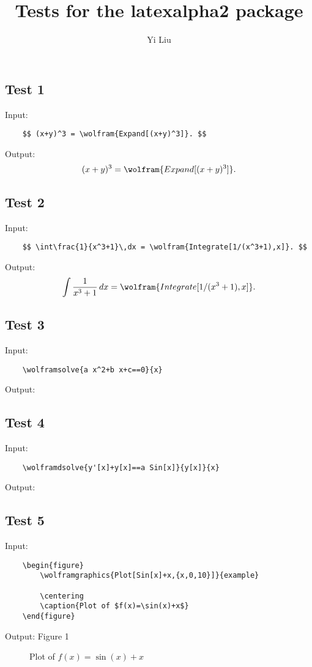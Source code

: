 \documentclass{article}
\title{Tests for the \textsf{latexalpha2} package}
\author{Yi Liu}
\begin{document}
\maketitle

\subsection*{Test 1}
Input:
\begin{verbatim}
    $$ (x+y)^3 = \wolfram{Expand[(x+y)^3]}. $$
\end{verbatim}

Output:
$$ (x+y)^3 = \wolfram{Expand[(x+y)^3]}. $$

\subsection*{Test 2}
Input:
\begin{verbatim}
    $$ \int\frac{1}{x^3+1}\,dx = \wolfram{Integrate[1/(x^3+1),x]}. $$
\end{verbatim}

Output:
$$ \int\frac{1}{x^3+1}\,dx = \wolfram{Integrate[1/(x^3+1),x]}. $$

\subsection*{Test 3}
Input:
\begin{verbatim}
    \wolframsolve{a x^2+b x+c==0}{x}
\end{verbatim}

Output:

\subsection*{Test 4}
Input:
\begin{verbatim}
    \wolframdsolve{y'[x]+y[x]==a Sin[x]}{y[x]}{x}
\end{verbatim}

Output:

\subsection*{Test 5}
Input:
\begin{verbatim}
    \begin{figure}
        \wolframgraphics{Plot[Sin[x]+x,{x,0,10}]}{example}
        
        \centering
        \caption{Plot of $f(x)=\sin(x)+x$}
    \end{figure}
\end{verbatim}

Output: Figure 1

\begin{figure}
    
    \centering
    \caption{Plot of $f(x)=\sin(x)+x$}
\end{figure}
\end{document}
